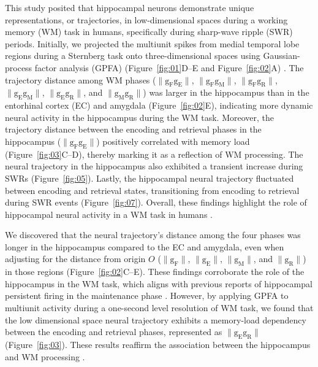 \documentclass[final,3p,times,twocolumn]{elsarticle}
\newcommand{\REDSTARTS}{\color{red}}
\newcommand{\GREENENDS}{\color{black}}
\begin{document}
\begin{abstract\GREENENDS \REDSTARTS ll_Tables}
This study posited that hippocampal neurons demonstrate unique representations, or trajectories, in low-dimensional spaces during a working memory (WM) task in humans, specifically during sharp-wave ripple (SWR) periods. Initially, we projected the multiunit spikes from medial temporal lobe regions during a Sternberg task onto three-dimensional spaces using Gaussian-process factor analysis (GPFA) (Figure~\ref{fig:01}D--E and Figure~\ref{fig:02}A) \cite{yu_gaussian-process_2009}. The trajectory distance among WM phases ($\mathrm{\lVert g_{F}g_{E} \rVert}$, $\mathrm{\lVert g_{F}g_{M} \rVert}$, $\mathrm{\lVert g_{F}g_{R} \rVert}$, $\mathrm{\lVert g_{E}g_{M} \rVert}$, $\mathrm{\lVert g_{E}g_{R} \rVert}$, and $\mathrm{\lVert g_{M}g_{R} \rVert}$) was larger in the hippocampus than in the entorhinal cortex (EC) and amygdala (Figure~\ref{fig:02}E), indicating more dynamic neural activity in the hippocampus during the WM task. Moreover, the trajectory distance between the encoding and retrieval phases in the hippocampus ($\mathrm{\lVert g_{F}g_{E} \rVert}$) positively correlated with memory load (Figure~\ref{fig:03}C--D), thereby marking it as a reflection of WM processing. The neural trajectory in the hippocampus also exhibited a transient increase during SWRs (Figure~\ref{fig:05}). Lastly, the hippocampal neural trajectory fluctuated between encoding and retrieval states, transitioning from encoding to retrieval during SWR events (Figure~\ref{fig:07}). Overall, these findings highlight the role of hippocampal neural activity in a WM task in humans \cite{naber_reciprocal_2001,van_strien_anatomy_2009,strange_functional_2014}.

We discovered that the neural trajectory's distance among the four phases was longer in the hippocampus compared to the EC and amygdala, even when adjusting for the distance from origin $O$ ($\mathrm{\lVert g_{F} \rVert}$, $\mathrm{\lVert g_{E} \rVert}$, $\mathrm{\lVert g_{M} \rVert}$, and $\mathrm{\lVert g_{R} \rVert}$) in those regions (Figure~\ref{fig:02}C--E). These findings corroborate the role of the hippocampus in the WM task, which aligns with previous reports of hippocampal persistent firing in the maintenance phase \cite{boran_persistent_2019} \cite{kaminski_persistently_2017} \cite{kornblith_persistent_2017} \cite{faraut_dataset_2018}. However, by applying GPFA to multiunit activity during a one-second level resolution of WM task, we found that the low dimensional space neural trajectory exhibits a memory-load dependency between the encoding and retrieval phases, represented as $\mathrm{\lVert g_{E}g_{R} \rVert}$ (Figure~\ref{fig:03}). These results reaffirm the association between the hippocampus and WM processing \cite{oso_boran_2020}.


\end{abstract\GREENENDS \REDSTARTS ll_Tables}
\end{document}
